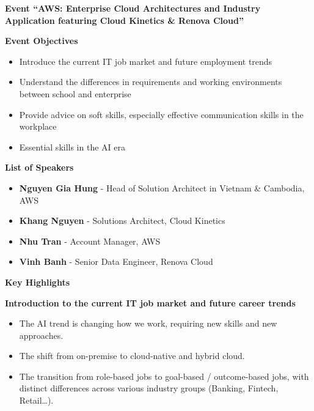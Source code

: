 \vspace{0.5em}\noindent\textbf{Event ``AWS: Enterprise Cloud Architectures and Industry
Application featuring Cloud Kinetics \& Renova
Cloud''}\par

\vspace{0.5em}\noindent\textbf{Event Objectives}\par

\begin{itemize}
\tightlist
\item
  Introduce the current IT job market and future employment trends
\item
  Understand the differences in requirements and working environments
  between school and enterprise
\item
  Provide advice on soft skills, especially effective communication
  skills in the workplace
\item
  Essential skills in the AI era
\end{itemize}

\vspace{0.5em}\noindent\textbf{List of Speakers}\par

\begin{itemize}
\tightlist
\item
  \textbf{Nguyen Gia Hung} - Head of Solution Architect in Vietnam \&
  Cambodia, AWS
\item
  \textbf{Khang Nguyen} - Solutions Architect, Cloud Kinetics
\item
  \textbf{Nhu Tran} - Account Manager, AWS
\item
  \textbf{Vinh Banh} - Senior Data Engineer, Renova Cloud
\end{itemize}

\vspace{0.5em}\noindent\textbf{Key Highlights}\par

\vspace{0.5em}\noindent\textbf{Introduction to the current IT job market and future career
trends}\par

\begin{itemize}
\tightlist
\item
  The AI trend is changing how we work, requiring new skills and new
  approaches.
\item
  The shift from on-premise to cloud-native and hybrid cloud.
\item
  The transition from role-based jobs to goal-based / outcome-based
  jobs, with distinct differences across various industry groups
  (Banking, Fintech, Retail\ldots).
\end{itemize}

